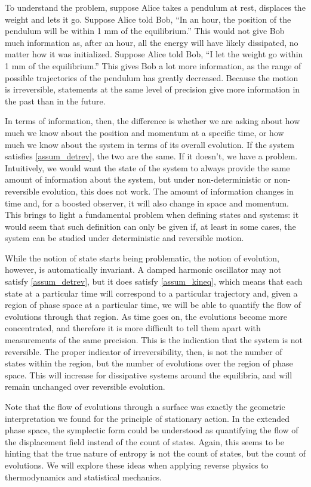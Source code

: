 To understand the problem, suppose Alice takes a pendulum at rest, displaces the weight and lets it go. Suppose Alice told Bob, ``In an hour, the position of the pendulum will be within 1 mm of the equilibrium.'' This would not give Bob much information as, after an hour, all the energy will have likely dissipated, no matter how it was initialized. Suppose Alice told Bob, ``I let the weight go within 1 mm of the equilibrium.'' This gives Bob a lot more information, as the range of possible trajectories of the pendulum has greatly decreased. Because the motion is irreversible, statements at the same level of precision give more information in the past than in the future.

In terms of information, then, the difference is whether we are asking about how much we know about the position and momentum at a specific time, or how much we know about the system in terms of its overall evolution. If the system satisfies \ref{assum_detrev}, the two are the same. If it doesn't, we have a problem. Intuitively, we would want the state of the system to always provide the same amount of information about the system, but under non-deterministic or non-reversible evolution, this does not work. The amount of information changes in time and, for a boosted observer, it will also change in space and momentum. This brings to light a fundamental problem when defining states and systems: it would seem that such definition can only be given if, at least in some cases, the system can be studied under deterministic and reversible motion.

While the notion of state starts being problematic, the notion of evolution, however, is automatically invariant. A damped harmonic oscillator may not satisfy \ref{assum_detrev}, but it does satisfy \ref{assum_kineq}, which means that each state at a particular time will correspond to a particular trajectory and, given a region of phase space at a particular time, we will be able to quantify the flow of evolutions through that region. As time goes on, the evolutions become more concentrated, and therefore it is more difficult to tell them apart with measurements of the same precision. This is the indication that the system is not reversible. The proper indicator of irreversibility, then, is not the number of states within the region, but the number of evolutions over the region of phase space. This will increase for dissipative systems around the equilibria, and will remain unchanged over reversible evolution.

Note that the flow of evolutions through a surface was exactly the geometric interpretation we found for the principle of stationary action. In the extended phase space, the symplectic form could be understood as quantifying the flow of the displacement field instead of the count of states. Again, this seems to be hinting that the true nature of entropy is not the count of states, but the count of evolutions. We will explore these ideas when applying reverse physics to thermodynamics and statistical mechanics.

